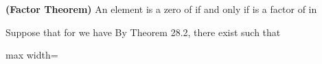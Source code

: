 \documentclass[11pt,oneside]{article}
\begin{document}
\begin{BookBody}
 \textbf{(Factor Theorem)} An element  is a zero of  if and only if  is a factor of  in 

 Suppose that for  we have  By Theorem 28.2, there exist   such that

\begin{center}\begin{adjustbox}{max width=\linewidth}\end{adjustbox}\end{center}

\end{BookBody}

\BookNarrativetrue
\end{document}
